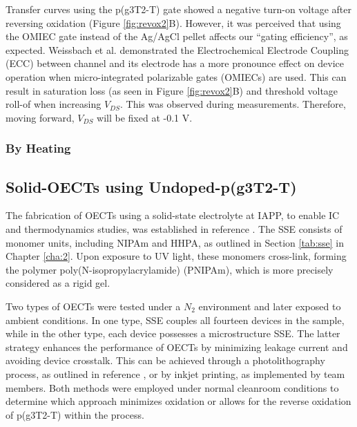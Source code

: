 Transfer curves using the p(g3T2-T) gate showed a negative turn-on voltage after reversing oxidation (Figure \ref{fig:revox2}B). However, it was perceived that using the OMIEC gate instead of the Ag/AgCl pellet affects our ``gating efficiency'', as expected. Weissbach et al.  \cite{weissbachUnravelingElectrochemicalElectrode2023} demonstrated the Electrochemical Electrode Coupling (ECC) between channel and its electrode has a more pronounce effect on device operation when micro-integrated polarizable gates (OMIECs) are used. This can result in saturation loss (as seen in Figure \ref{fig:revox2}B) and threshold voltage roll-of when increasing $V_{DS}$. This was observed during measurements. Therefore, moving forward, $V_{DS}$ will be fixed at -0.1 V.

\subsubsection{By Heating}


\subsection{Solid-OECTs using Undoped-p(g3T2-T)}
The fabrication of OECTs using a solid-state electrolyte at IAPP, to enable IC and thermodynamics studies, was established in reference  \cite{weissbachPhotopatternableSolidElectrolyte2022}. The SSE consists of monomer units, including NIPAm and HHPA, as outlined in Section \ref{tab:sse} in Chapter \ref{cha:2}. %
Upon exposure to UV light, these monomers cross-link, forming the polymer poly(N-isopropylacrylamide) (PNIPAm), which is more precisely considered as a rigid gel. 

Two types of OECTs were tested under a $N_{2}$ environment and later exposed to ambient conditions. In one type, SSE couples all fourteen devices in the sample, while in the other type, each device possesses a microstructure SSE. The latter strategy enhances the performance of OECTs by minimizing leakage current and avoiding device crosstalk. This can be achieved through a photolithography process, as outlined in reference \cite{weissbachPhotopatternableSolidElectrolyte2022}, or by inkjet printing, as implemented by team members. Both methods were employed under normal cleanroom conditions to determine which  approach minimizes oxidation or allows for the reverse oxidation of p(g3T2-T) within the process. 


